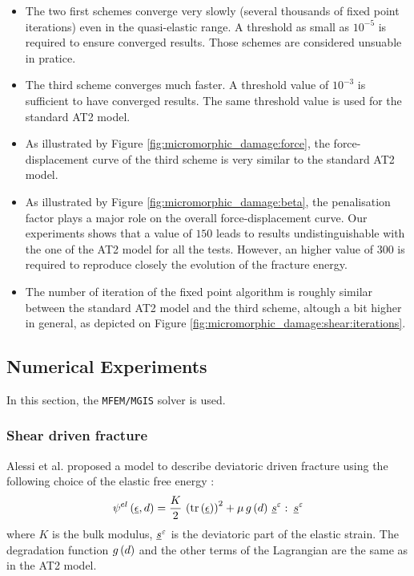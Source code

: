 \begin{itemize}
  \item The two first schemes converge very slowly (several thousands of fixed
  point iterations) even in the quasi-elastic range. A threshold as
  small as \(10^{-5}\) is required to ensure converged results. Those
  schemes are considered unsuable in pratice.
  \item The third scheme converges much faster. A threshold value of
  \(10^{-3}\) is sufficient to have converged results. The same
  threshold value is used for the standard AT2 model.
  \item As illustrated by Figure \ref{fig:micromorphic_damage:force}, the
  force-displacement curve of the third scheme is very similar to the
  standard AT2 model.
  \item As illustrated by Figure \ref{fig:micromorphic_damage:beta}, the
  penalisation factor plays a major role on the overall
  force-displacement curve. Our experiments shows that a value of
  \(150\) leads to results undistinguishable with the one of the AT2
  model for all the tests. However, an higher value of \(300\) is
  required to reproduce closely the evolution of the fracture energy.
  \item The number of iteration of the fixed point algorithm is roughly
  similar between the standard AT2 model and the third scheme, altough a
  bit higher in general, as depicted on Figure
  \ref{fig:micromorphic_damage:shear:iterations}.
\end{itemize}

\subsection{Numerical Experiments}
\label{sec:micromorphicdamage:numerical_experiments}

In this section, the \texttt{MFEM/MGIS} solver is used.

\subsubsection{Shear driven fracture}

Alessi et al. proposed a model to describe deviatoric driven fracture
using the following choice of the elastic free energy
\cite{alessi_phase-field_2020}:
\[
{\psi}^{el}\left(\underline{\epsilon}, d\right)=
\displaystyle \frac{\displaystyle K}{\displaystyle 2}\,\left(\operatorname{tr}\left(\underline{\epsilon}\right)\right)^{2}+
\mu\,g\left(d\right)\,\underline{s}^{\varepsilon}\,\colon\,\underline{s}^{\varepsilon}
\]
where \(K\) is the bulk modulus, \(\underline{s}^{\varepsilon}\) is the
deviatoric part of the elastic strain. The degradation function
\(g\left(d\right)\) and the other terms of the Lagrangian are the same as in
the AT2 model.

